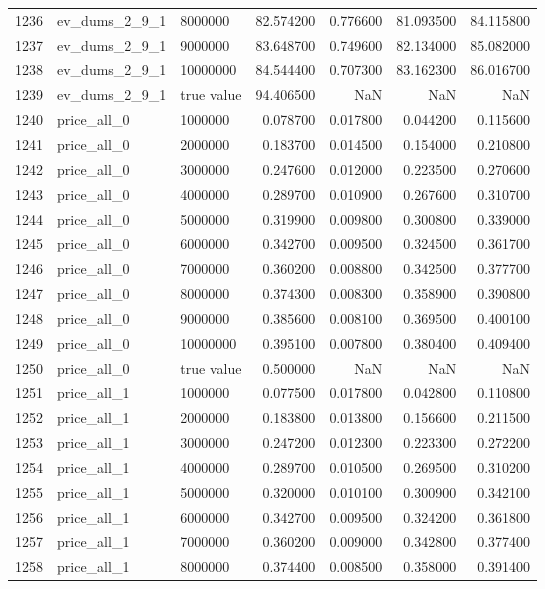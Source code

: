 \begin{tabular}{lllrrrr}
1236 & ev_dums_2_9_1 & 8000000 & 82.574200 & 0.776600 & 81.093500 & 84.115800 \\
1237 & ev_dums_2_9_1 & 9000000 & 83.648700 & 0.749600 & 82.134000 & 85.082000 \\
1238 & ev_dums_2_9_1 & 10000000 & 84.544400 & 0.707300 & 83.162300 & 86.016700 \\
1239 & ev_dums_2_9_1 & true value & 94.406500 & NaN & NaN & NaN \\
1240 & price_all_0 & 1000000 & 0.078700 & 0.017800 & 0.044200 & 0.115600 \\
1241 & price_all_0 & 2000000 & 0.183700 & 0.014500 & 0.154000 & 0.210800 \\
1242 & price_all_0 & 3000000 & 0.247600 & 0.012000 & 0.223500 & 0.270600 \\
1243 & price_all_0 & 4000000 & 0.289700 & 0.010900 & 0.267600 & 0.310700 \\
1244 & price_all_0 & 5000000 & 0.319900 & 0.009800 & 0.300800 & 0.339000 \\
1245 & price_all_0 & 6000000 & 0.342700 & 0.009500 & 0.324500 & 0.361700 \\
1246 & price_all_0 & 7000000 & 0.360200 & 0.008800 & 0.342500 & 0.377700 \\
1247 & price_all_0 & 8000000 & 0.374300 & 0.008300 & 0.358900 & 0.390800 \\
1248 & price_all_0 & 9000000 & 0.385600 & 0.008100 & 0.369500 & 0.400100 \\
1249 & price_all_0 & 10000000 & 0.395100 & 0.007800 & 0.380400 & 0.409400 \\
1250 & price_all_0 & true value & 0.500000 & NaN & NaN & NaN \\
1251 & price_all_1 & 1000000 & 0.077500 & 0.017800 & 0.042800 & 0.110800 \\
1252 & price_all_1 & 2000000 & 0.183800 & 0.013800 & 0.156600 & 0.211500 \\
1253 & price_all_1 & 3000000 & 0.247200 & 0.012300 & 0.223300 & 0.272200 \\
1254 & price_all_1 & 4000000 & 0.289700 & 0.010500 & 0.269500 & 0.310200 \\
1255 & price_all_1 & 5000000 & 0.320000 & 0.010100 & 0.300900 & 0.342100 \\
1256 & price_all_1 & 6000000 & 0.342700 & 0.009500 & 0.324200 & 0.361800 \\
1257 & price_all_1 & 7000000 & 0.360200 & 0.009000 & 0.342800 & 0.377400 \\
1258 & price_all_1 & 8000000 & 0.374400 & 0.008500 & 0.358000 & 0.391400 \\

\end{tabular}
